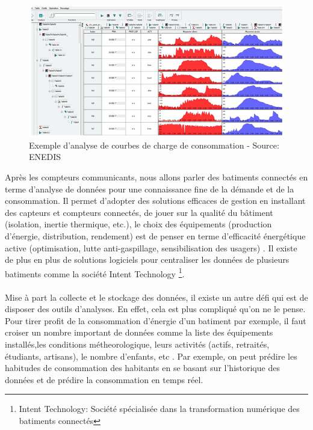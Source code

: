 \documentclass[11pt,a4paper]{report}
\begin{document}
 \begin{figure}[h]
   \centering
   \includegraphics[scale=0.5]{enedis.jpg}
      \caption{Exemple d'analyse de courbes de charge de consommation - Source: ENEDIS}
      \label{enedis}
\end{figure}


Après les compteurs communicants, nous allons parler des batiments connectés en terme d'analyse de données pour une connaissance fine de la démande et de la consommation. Il permet d’adopter des solutions efficaces de gestion en installant des capteurs et compteurs connectés, de jouer sur la qualité du bâtiment (isolation, inertie thermique, etc.), le choix des équipements (production d’énergie, distribution, rendement) est de penser en terme d’efficacité énergétique active (optimisation, lutte anti-gaspillage, sensibilisation des usagers) \cite{batiment}. Il existe de plus en plus de solutions logiciels pour centraliser les données de plusieurs batiments comme la société Intent Technology \footnote{Intent Technology: Société spécialisée dans la transformation numérique des batiments connectés}.\\\\
Mise à part la collecte et le stockage des données, il existe un autre défi qui est de disposer des outils d'analyses. En effet, cela est plus compliqué qu'on ne le pense. Pour tirer profit de la consommation d'énergie d'un batiment par exemple, il faut croiser un nombre important de données comme la liste des équipements installés,les conditions métheorologique, leurs activités (actifs, retraités, étudiants, artisans), le nombre d’enfants, etc \cite{batiment1}.
Par exemple, on peut prédire les habitudes de consommation des habitants en se basant sur l’historique des données et de prédire la consommation en temps réel.



%
%
\end{document}
